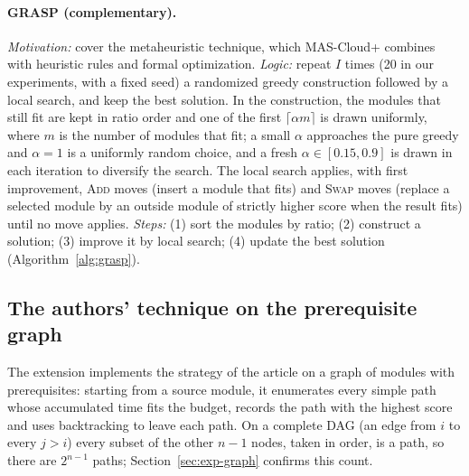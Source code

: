 \paragraph{GRASP (complementary).} \emph{Motivation:} cover the metaheuristic technique, which MAS-Cloud+ \cite{mendes2024mascloud} combines with heuristic rules and formal optimization. \emph{Logic:} repeat $I$ times (20 in our experiments, with a fixed seed) a randomized greedy construction followed by a local search, and keep the best solution. In the construction, the modules that still fit are kept in ratio order and one of the first $\lceil\alpha m\rceil$ is drawn uniformly, where $m$ is the number of modules that fit; a small $\alpha$ approaches the pure greedy and $\alpha=1$ is a uniformly random choice, and a fresh $\alpha\in[0.15,0.9]$ is drawn in each iteration to diversify the search. The local search applies, with first improvement, \textsc{Add} moves (insert a module that fits) and \textsc{Swap} moves (replace a selected module by an outside module of strictly higher score when the result fits) until no move applies. \emph{Steps:} (1) sort the modules by ratio; (2) construct a solution; (3) improve it by local search; (4) update the best solution (Algorithm~\ref{alg:grasp}).

\subsection{The authors' technique on the prerequisite graph}

The extension  implements the strategy of the article on a graph of modules with prerequisites: starting from a source module, it enumerates every simple path whose accumulated time fits the budget, records the path with the highest score and uses backtracking to leave each path. On a complete DAG (an edge from $i$ to every $j>i$) every subset of the other $n-1$ nodes, taken in order, is a path, so there are $2^{n-1}$ paths; Section~\ref{sec:exp-graph} confirms this count.
